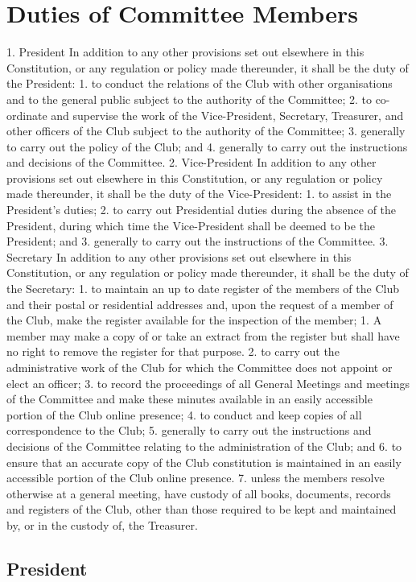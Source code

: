 \documentclass[12pt]{article} %
\begin{document}
\section{Duties of Committee Members}
1. President
In addition to any other provisions set out elsewhere in this Constitution, or any
regulation or policy made thereunder, it shall be the duty of the President:
1. to conduct the relations of the Club with other organisations and to the
general public subject to the authority of the Committee;
2. to co-ordinate and supervise the work of the Vice-President, Secretary,
Treasurer, and other officers of the Club subject to the authority of the
Committee;
3. generally to carry out the policy of the Club; and
4. generally to carry out the instructions and decisions of the Committee.
2. Vice-President
In addition to any other provisions set out elsewhere in this Constitution, or any
regulation or policy made thereunder, it shall be the duty of the Vice-President:
1. to assist in the President's duties;
2. to carry out Presidential duties during the absence of the President, during
which time the Vice-President shall be deemed to be the President; and
3. generally to carry out the instructions of the Committee.
3. Secretary
In addition to any other provisions set out elsewhere in this Constitution, or any
regulation or policy made thereunder, it shall be the duty of the Secretary:
1. to maintain an up to date register of the members of the Club and their postal
or residential addresses and, upon the request of a member of the Club, make
the register available for the inspection of the member;
1. A member may make a copy of or take an extract from the register
but shall have no right to remove the register for that purpose.
2. to carry out the administrative work of the Club for which the Committee
does not appoint or elect an officer;
3. to record the proceedings of all General Meetings and meetings of the
Committee and make these minutes available in an easily accessible portion
of the Club online presence;
4. to conduct and keep copies of all correspondence to the Club;
5. generally to carry out the instructions and decisions of the Committee relating
to the administration of the Club; and
6. to ensure that an accurate copy of the Club constitution is maintained in an
easily accessible portion of the Club online presence.
7. unless the members resolve otherwise at a general meeting, have custody of
all books, documents, records and registers of the Club, other than those
required to be kept and maintained by, or in the custody of, the Treasurer.
\subsection{President}
\end{document}
